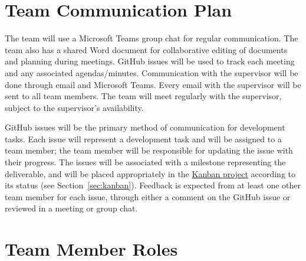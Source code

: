 \documentclass{article}
\begin{document}
\section{Team Communication Plan}

The team will use a Microsoft Teams group chat for regular communication. 
The team also has a shared Word document for collaborative editing of documents and planning during meetings.  GitHub issues will be used to track each meeting and any associated agendas/minutes.
Communication with the supervisor will be done through email and Microsoft Teams. 
Every email with the supervisor will be sent to all team members. 
The team will meet regularly with the supervisor, subject to the supervisor's availability.

GitHub issues will be the primary method of communication for development tasks. Each issue will represent a development task and will be assigned to a team member; the team member will be responsible for updating the issue with their progress.  
The issues will be associated with a milestone representing the deliverable, and will be placed appropriately in the \href{https://github.com/users/robertLam04/projects/5}{Kanban project} according to its status (see Section~\ref{sec:kanban}).
Feedback is expected from at least one other team member for each issue, through either a comment on the GitHub issue or reviewed in a meeting or group chat.

\section{Team Member Roles}
\end{document}
